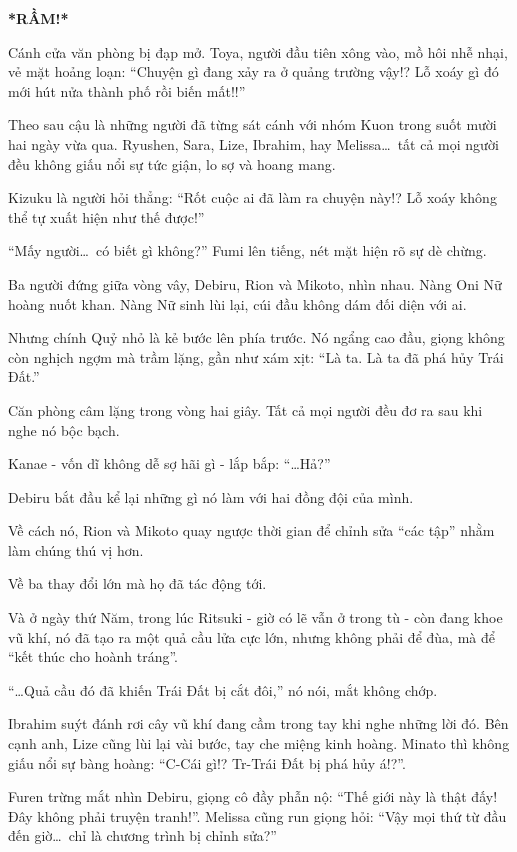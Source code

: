 \documentclass[../main.tex]{subfiles}
\begin{document}
\textbf{*RẦM!*}

Cánh cửa văn phòng bị đạp mở. Toya, người đầu tiên xông vào, mồ hôi nhễ nhại, vẻ mặt hoảng loạn: ``Chuyện gì đang xảy ra ở quảng trường vậy!? Lỗ xoáy gì đó mới hút nửa thành phố rồi biến mất!!''

Theo sau cậu là những người đã từng sát cánh với nhóm Kuon trong suốt mười hai ngày vừa qua. Ryushen, Sara, Lize, Ibrahim, hay Melissa\dots\ tất cả mọi người đều không giấu nổi sự tức giận, lo sợ và hoang mang.

Kizuku là người hỏi thẳng: ``Rốt cuộc ai đã làm ra chuyện này!? Lỗ xoáy không thể tự xuất hiện như thế được!''

``Mấy người\dots\ có biết gì không?'' Fumi lên tiếng, nét mặt hiện rõ sự dè chừng.

Ba người đứng giữa vòng vây, Debiru, Rion và Mikoto, nhìn nhau. Nàng Oni Nữ hoàng nuốt khan. Nàng Nữ sinh lùi lại, cúi đầu không dám đối diện với ai.

Nhưng chính Quỷ nhỏ là kẻ bước lên phía trước. Nó ngẩng cao đầu, giọng không còn nghịch ngợm mà trầm lặng, gần như xám xịt: ``Là ta. Là ta đã phá hủy Trái Đất.''

Căn phòng câm lặng trong vòng hai giây. Tất cả mọi người đều đơ ra sau khi nghe nó bộc bạch.

Kanae - vốn dĩ không dễ sợ hãi gì - lắp bắp: ``\dots Hả?''

Debiru bắt đầu kể lại những gì nó làm với hai đồng đội của mình.

Về cách nó, Rion và Mikoto quay ngược thời gian để chỉnh sửa ``các tập'' nhằm làm chúng thú vị hơn.

Về ba thay đổi lớn mà họ đã tác động tới.

Và ở ngày thứ Năm, trong lúc Ritsuki - giờ có lẽ vẫn ở trong tù - còn đang khoe vũ khí, nó đã tạo ra một quả cầu lửa cực lớn,  nhưng không phải để đùa, mà để ``kết thúc cho hoành tráng''.

``\dots Quả cầu đó đã khiến Trái Đất bị cắt đôi,'' nó nói, mắt không chớp.

Ibrahim suýt đánh rơi cây vũ khí đang cầm trong tay khi nghe những lời đó. Bên cạnh anh, Lize cũng lùi lại vài bước, tay che miệng kinh hoàng. Minato thì không giấu nổi sự bàng hoàng: ``C-Cái gì!? Tr-Trái Đất bị phá hủy á!?''.

Furen trừng mắt nhìn Debiru, giọng cô đầy phẫn nộ: ``Thế giới này là thật đấy! Đây không phải truyện tranh!''. Melissa cũng run giọng hỏi: ``Vậy mọi thứ từ đầu đến giờ\dots\ chỉ là chương trình bị chỉnh sửa?''
\end{document}

